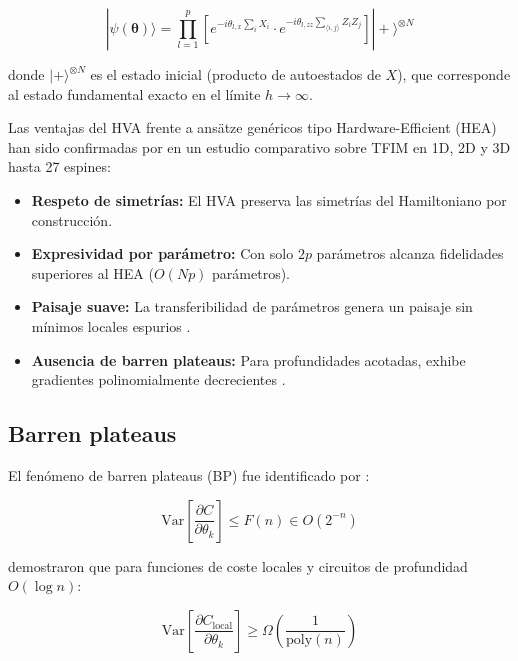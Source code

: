 \documentclass[11pt,a4paper,spanish]{book}
\begin{document}
\begin{equation}
|\psi(\boldsymbol{\theta})\rangle = \prod_{l=1}^{p} \left[ e^{-i\theta_{l,x} \sum_i X_i} \cdot e^{-i\theta_{l,zz} \sum_{\langle i,j \rangle} Z_i Z_j} \right] |+\rangle^{\otimes N}
\label{eq:hva}
\end{equation}

\noindent donde $|+\rangle^{\otimes N}$ es el estado inicial (producto de autoestados de $X$), que corresponde al estado fundamental exacto en el límite $h \to \infty$.

Las ventajas del HVA frente a ansätze genéricos tipo Hardware-Efficient (HEA) han sido confirmadas por \citet{tripathi2026} en un estudio comparativo sobre TFIM en 1D, 2D y 3D hasta 27 espines:

\begin{itemize}
    \item \textbf{Respeto de simetrías:} El HVA preserva las simetrías del Hamiltoniano por construcción.
    \item \textbf{Expresividad por parámetro:} Con solo $2p$ parámetros alcanza fidelidades superiores al HEA ($O(Np)$ parámetros).
    \item \textbf{Paisaje suave:} La transferibilidad de parámetros genera un paisaje sin mínimos locales espurios \citep{mele2022}.
    \item \textbf{Ausencia de barren plateaus:} Para profundidades acotadas, exhibe gradientes polinomialmente decrecientes \citep{wiersema2020}.
\end{itemize}

\subsection{Barren plateaus}

El fenómeno de barren plateaus (BP) fue identificado por \citet{mcclean2018}:

\begin{equation}
\text{Var}\left[\frac{\partial C}{\partial \theta_k}\right] \leq F(n) \in O(2^{-n})
\label{eq:bp}
\end{equation}

\citet{cerezo2021} demostraron que para funciones de coste locales y circuitos de profundidad $O(\log n)$:

\begin{equation}
\text{Var}\left[\frac{\partial C_{\text{local}}}{\partial \theta_k}\right] \geq \Omega\left(\frac{1}{\text{poly}(n)}\right)
\label{eq:local_bp}
\end{equation}
\end{document}
